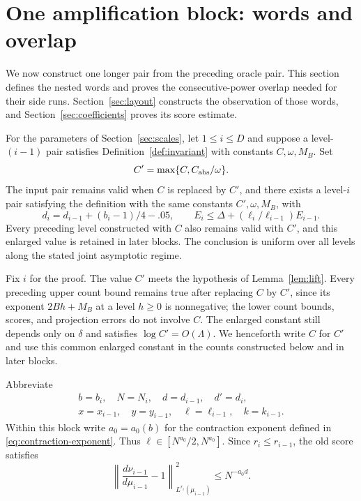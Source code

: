 \section{One amplification block: words and overlap}\label{sec:block}

We now construct one longer pair from the preceding oracle pair.  This section defines the nested words and proves the consecutive-power overlap needed for their side runs.  Section~\ref{sec:layout} constructs the observation of those words, and Section~\ref{sec:coefficients} proves its score estimate.

\begin{proposition}\label{prop:block}
For the parameters of Section~\ref{sec:scales}, let $1\le i\le D$ and suppose a level-$(i-1)$ pair satisfies Definition~\ref{def:invariant} with constants $C,\omega,M_B$.  Set
\[
 C'=\max\{C,C_{\rm abs}/\omega\}.
\]
The input pair remains valid when $C$ is replaced by $C'$, and there exists a level-$i$ pair satisfying the definition with the same constants $C',\omega,M_B$, with
\[
 d_i=d_{i-1}+(b_i-1)/4-.05,
 \qquad E_i\le\Delta+(\ell_i/\ell_{i-1})E_{i-1}.
\]
Every preceding level constructed with $C$ also remains valid with $C'$, and this enlarged value is retained in later blocks.  The conclusion is uniform over all levels along the stated joint asymptotic regime.
\end{proposition}

Fix $i$ for the proof.  The value $C'$ meets the hypothesis of Lemma~\ref{lem:lift}.  Every preceding upper count bound remains true after replacing $C$ by $C'$, since its exponent $2Bh+M_B$ at a level $h\ge0$ is nonnegative; the lower count bounds, scores, and projection errors do not involve $C$.  The enlarged constant still depends only on $\delta$ and satisfies $\log C'=O(\Lambda)$.  We henceforth write $C$ for $C'$ and use this common enlarged constant in the counts constructed below and in later blocks.

Abbreviate
\[
\begin{gathered}
 b=b_i,\quad N=N_i,\quad d=d_{i-1},\quad d'=d_i,\\
 x=x_{i-1},\quad y=y_{i-1},\quad \ell=\ell_{i-1},\quad k=k_{i-1}.
\end{gathered}
\]
Within this block write $a_0=a_0(b)$ for the contraction exponent defined in \eqref{eq:contraction-exponent}.  Thus $\ell\in[N^{a_0}/2,N^{a_0}]$.  Since $r_i\le r_{i-1}$, the old score satisfies
\begin{equation}\label{eq:old-score}
 \left\|\frac{d\nu_{i-1}}{d\mu_{i-1}}-1\right\|_{L^{r_i}(\mu_{i-1})}^2
       \le N^{-a_0d}.
\end{equation}

